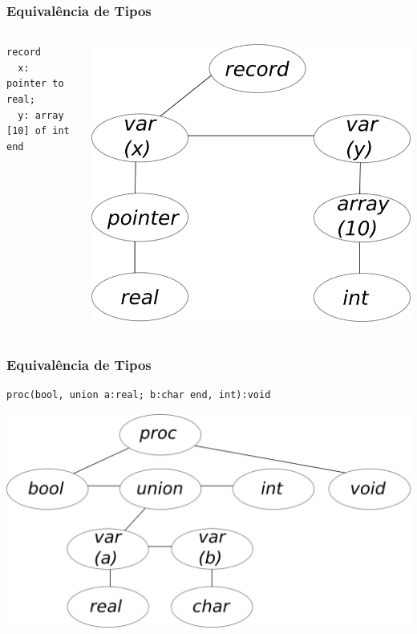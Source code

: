 \documentclass[table]{beamer}
\begin{document}
\begin{frame}[fragile]
   \frametitle{Equivalência de Tipos}
   \begin{columns}
   \begin{column}{0.5\textwidth}
   \begin{verbatim}
record
  x: pointer to real;
  y: array [10] of int
end
   \end{verbatim}
   \end{column}
   \begin{column}{0.5\textwidth}
   \includegraphics[width=\linewidth,height=\textheight,keepaspectratio]{figuras/record.png}
   \end{column}
   \end{columns}
\end{frame}

\begin{frame}[fragile]
   \frametitle{Equivalência de Tipos}
   \begin{verbatim}
proc(bool, union a:real; b:char end, int):void   
   \end{verbatim}
   \includegraphics[width=\linewidth,height=\textheight,keepaspectratio]{figuras/proc.png}
\end{frame}
\end{document}
